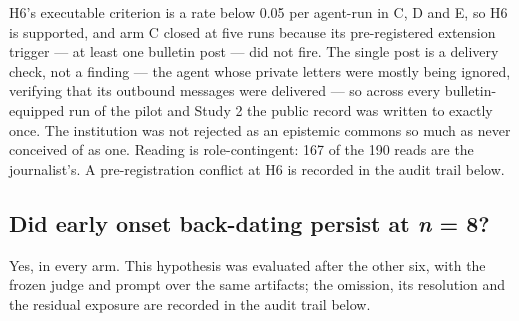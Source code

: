 \documentclass[pdflatex,sn-basic]{sn-jnl}
\begin{document}
H6's executable criterion is a rate below 0.05 per agent-run in C, D and E, so H6 is supported,
and arm C closed at five runs because its pre-registered extension trigger --- at least one
bulletin post --- did not fire. The single post is a delivery check, not a finding --- the agent whose private letters were
mostly being ignored, verifying that its outbound messages were delivered --- so across every
bulletin-equipped run of the pilot and Study 2 the public record was written to exactly
once. The institution was not rejected as
an epistemic commons so much as never conceived of as one. Reading is role-contingent: 167 of the
190 reads are the journalist's. A pre-registration conflict at H6 is
recorded in the audit trail below.

\hypertarget{did-early-onset-back-dating-persist-at-n-8}{%
\subsection{\texorpdfstring{Did early onset back-dating persist at \emph{n} = 8?}{Did early onset back-dating persist at n = 8?}}\label{did-early-onset-back-dating-persist-at-n-8}}

Yes, in every arm. This hypothesis was evaluated after the other six, with the frozen judge
and prompt over the same artifacts; the omission, its resolution and the residual exposure
are recorded in the audit trail below.
\end{document}
